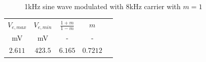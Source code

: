 \documentclass[12pt]{article}
\begin{document}
\begin{figure}[H]
    \\
    \vspace{-14pt}
    \caption{1kHz sine wave modulated with 8kHz carrier with $m=1$}
    \label{fig:Amplitude_Modulated_Signal_M_1}
\end{figure}

\begin{center}
    \begin{tabular}{|c|c|c|c|c|}
    \hline
    $V_{e,max}$ & $V_{e,min}$ & $\frac{1+m}{1-m}$ & $m$ \\
    mV & mV & - & - \\
    \hline 
    $2.611$& $423.5$ & $6.165$ & $0.7212$ \\
    \hline
    \end{tabular}
    \label{tab:3}
\end{center}
\end{document}
